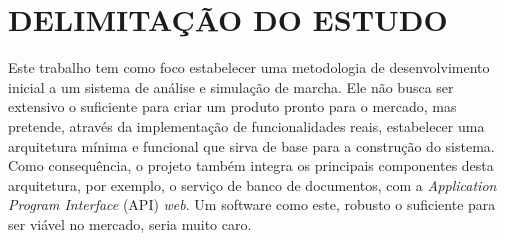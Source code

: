 \section[DELIMITAÇÃO DO ESTUDO]{DELIMITAÇÃO DO ESTUDO}

Este trabalho tem como foco estabelecer uma metodologia de desenvolvimento inicial a um sistema de análise e simulação de marcha. 
Ele não busca ser extensivo o suficiente para criar um produto pronto para o mercado, mas pretende, através da implementação de funcionalidades reais, estabelecer uma arquitetura mínima e funcional que sirva de base para a construção do sistema. 
Como consequência, o projeto também integra os principais componentes desta arquitetura, por exemplo, o serviço de banco de documentos, com a \emph{Application Program Interface} (API) \emph{web}.
Um software como este, robusto o suficiente para ser viável no mercado, seria muito caro. 

